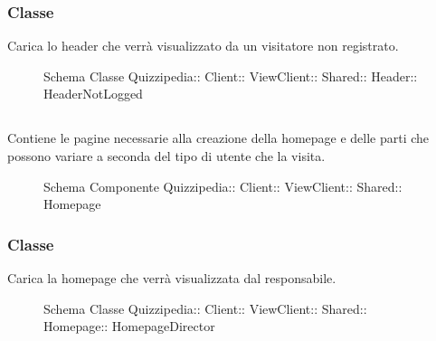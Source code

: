 \subsubsection{Classe }
Carica lo header che verrà visualizzato da un visitatore non registrato.
\begin{figure}[H]
\centering
\noindent{}
\caption[Schema Classe HeaderNotLogged]{Schema Classe Quizzipedia:: Client:: ViewClient:: Shared:: Header:: HeaderNotLogged}
\end{figure}
\subsection{}
Contiene le pagine necessarie alla creazione della homepage e delle parti che possono variare a seconda del tipo di utente che la visita.
\begin{figure}[H]
\centering
\noindent{}
\caption[Schema Componente Quizzipedia::Client::ViewClient::Shared::Homepage]{Schema Componente Quizzipedia:: Client:: ViewClient:: Shared:: Homepage}
\end{figure}
\subsubsection{Classe }
Carica la homepage che verrà visualizzata dal responsabile.
\begin{figure}[H]
\centering
\noindent{}
\caption[Schema Classe HomepageDirector]{Schema Classe Quizzipedia:: Client:: ViewClient:: Shared:: Homepage:: HomepageDirector}
\end{figure}
